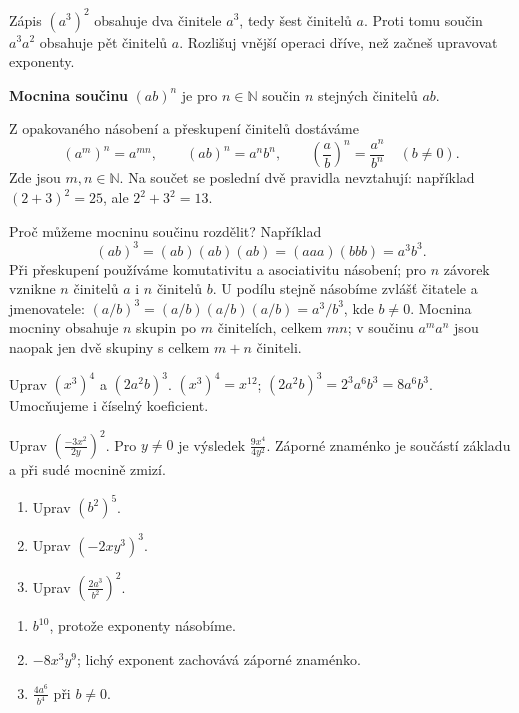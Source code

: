 \documentclass[11pt,a4paper]{article}
\begin{document}

Zápis $(a^3)^2$ obsahuje dva činitele $a^3$, tedy šest činitelů $a$. Proti tomu součin $a^3a^2$ obsahuje pět činitelů $a$. Rozlišuj vnější operaci dříve, než začneš upravovat exponenty.

\begin{definiceBox}[title={Připomenutí definice},breakable=false]
\textbf{Mocnina součinu} $(ab)^n$ je pro $n\in\mathbb N$ součin $n$ stejných činitelů $ab$.
\end{definiceBox}


Z opakovaného násobení a přeskupení činitelů dostáváme
\[
(a^m)^n=a^{mn},\qquad (ab)^n=a^nb^n,\qquad
\left(\frac ab\right)^n=\frac{a^n}{b^n}\quad(b\ne0).
\]
Zde jsou $m,n\in\mathbb N$. Na součet se poslední dvě pravidla nevztahují: například $(2+3)^2=25$, ale $2^2+3^2=13$.

Proč můžeme mocninu součinu rozdělit? Například
\[
(ab)^3=(ab)(ab)(ab)=(aaa)(bbb)=a^3b^3.
\]
Při přeskupení používáme komutativitu a asociativitu násobení;
pro $n$ závorek vznikne $n$ činitelů $a$ i $n$ činitelů $b$.
U podílu stejně násobíme zvlášť čitatele a jmenovatele:
$(a/b)^3=(a/b)(a/b)(a/b)=a^3/b^3$, kde $b\ne0$.
Mocnina mocniny obsahuje $n$ skupin po $m$ činitelích, celkem $mn$;
v součinu $a^ma^n$ jsou naopak jen dvě skupiny s celkem $m+n$ činiteli.


\begin{prikladReseniBox}[title={Příklad 1},breakable=false]
Uprav $(x^3)^4$ a $(2a^2b)^3$.
\tcblower
$(x^3)^4=x^{12}$; $(2a^2b)^3=2^3a^6b^3=8a^6b^3$. Umocňujeme i číselný koeficient.
\end{prikladReseniBox}


\begin{prikladReseniBox}[title={Příklad 2},breakable=false]
Uprav $\left(\frac{-3x^2}{2y}\right)^2$.
\tcblower
Pro $y\ne0$ je výsledek $\frac{9x^4}{4y^2}$. Záporné znaménko je součástí základu a při sudé mocnině zmizí.
\end{prikladReseniBox}



\begin{zadaniReseniBox}[title={Procvičení},breakable=false]
\begin{enumerate}[label=\alph*)]
\item Uprav $(b^2)^5$.
\item Uprav $(-2xy^3)^3$.
\item Uprav $\left(\frac{2a^3}{b^2}\right)^2$.
\end{enumerate}
\tcblower
\begin{enumerate}[label=\alph*)]
\item $b^{10}$, protože exponenty násobíme.
\item $-8x^3y^9$; lichý exponent zachovává záporné znaménko.
\item $\frac{4a^6}{b^4}$ při $b\ne0$.
\end{enumerate}
\end{zadaniReseniBox}
\end{document}
